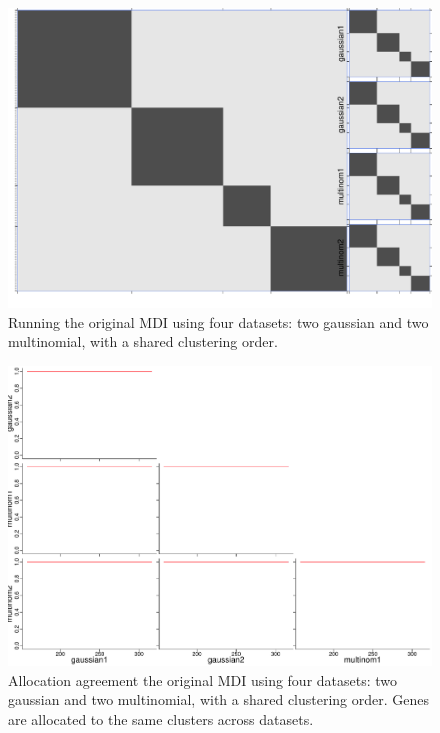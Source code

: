 \documentclass[10pt,a4paper]{article}
\begin{document}
\begin{landscape}
\begin{figure}[htbp]
\label{fig:multinom1}
\includegraphics[width = 0.95\linewidth]{plots/mdi_orig_consensus.pdf}
\caption{Running the original MDI using four datasets: two gaussian and two multinomial, with a shared clustering order.}
\end{figure}
\begin{figure}[htbp]
\label{fig:multinom1}
\includegraphics[width = 0.95\linewidth]{plots/mdi_orig_agreement.pdf}
\caption{Allocation agreement the original MDI using four datasets: two gaussian and two multinomial, with a shared clustering order. Genes are allocated to the same clusters across datasets.}
\end{figure}
\begin{figure}[htbp]
\label{fig:multinom1}

\end{figure}
\end{landscape}
\end{document}
